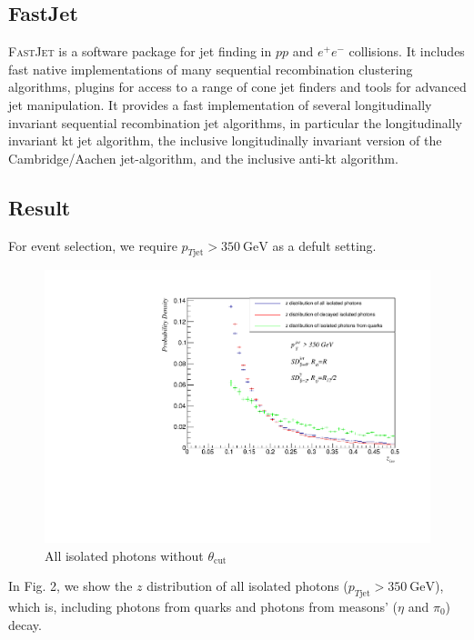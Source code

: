 \documentclass[a4paper, 12pt]{article}
\begin{document}
	\subsection{FastJet}
		\textsc{FastJet} is a software package for jet finding in $pp$ and $e^+e^-$ collisions. It includes fast native implementations
		of many sequential recombination clustering algorithms, plugins for access to a range of cone jet finders and tools for advanced
		jet manipulation. It provides a fast implementation of several longitudinally invariant sequential recombination jet algorithms, in
		particular the longitudinally invariant kt jet algorithm, the inclusive longitudinally invariant version of the Cambridge/Aachen
		jet-algorithm, and the inclusive anti-kt algorithm.
	\subsection{Result}
		For event selection, we require $p_{T\mathrm{jet}}>350\mathrm{~GeV}$ as a defult setting.
		\begin{figure}[t]
			\centering
			\includegraphics[width=\linewidth]{1.pdf}
			\caption{All isolated photons without $\theta_{\mathrm{cut}}$}
		\end{figure}
		In Fig. 2, we show the $z$ distribution of all isolated photons ($p_{T\mathrm{jet}}>350\mathrm{~GeV}$), which is, including
		photons from quarks and photons from measons' ($\eta$ and $\pi_0$) decay.\par
\end{document}
